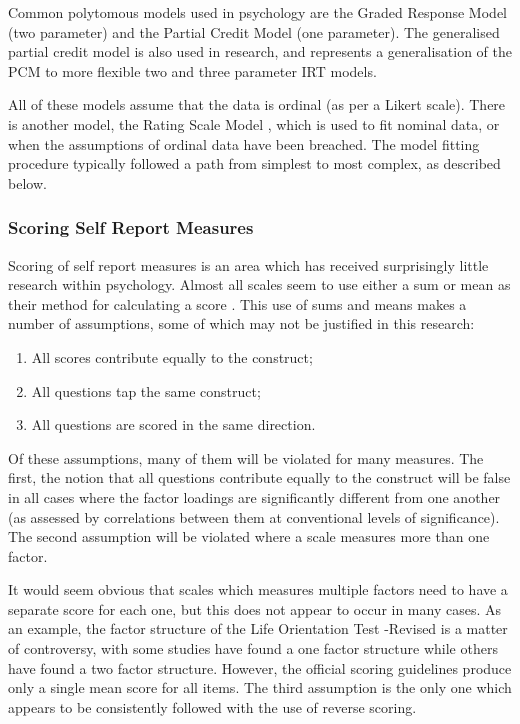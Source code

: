 
Common polytomous models used in psychology are the Graded Response Model \cite{van1997handbook} (two parameter) and the Partial Credit Model (one parameter)\cite{fischer1995rasch}. The generalised partial credit model is also used in research, and represents a generalisation of the PCM to more flexible two and three parameter IRT models. 

All of these models assume that the data is ordinal (as per a Likert scale). There is another model, the Rating Scale Model \cite{bock1997nominal}, which is used to fit nominal data, or when the assumptions of ordinal data have been breached. The model fitting procedure typically followed a path from simplest to most complex, as described below.

\subsubsection{Scoring Self Report Measures}
\label{sec:scoring-self-report}
Scoring of self report measures is an area which has received surprisingly little research within psychology. Almost all scales seem to use either a sum or mean as their method for calculating a score \cite{borsboom2006attack}. This use of sums and means makes a number of assumptions, some of which may not be justified in this research:

\begin{enumerate}
\item All scores contribute equally to the construct;
\item All questions tap the same construct;
\item All questions are scored in the same direction.
\end{enumerate}

Of these assumptions, many of them will be violated for many measures. The first, the notion that all questions contribute equally to the construct will be false in all cases where the factor loadings are significantly different from one another (as assessed by correlations between them at conventional levels of significance). The second assumption will be violated where a scale measures more than one factor. 

It would seem obvious that scales which measures multiple factors need to have a separate score for each one, but this does not appear to occur in many cases. As an example, the factor structure of the Life Orientation Test -Revised is a matter of controversy, with some studies have found a one factor structure while others have found a two factor structure. However, the official scoring guidelines produce only a single mean score for all items.  The third assumption is the only one which appears to be consistently followed with the use of reverse scoring.

